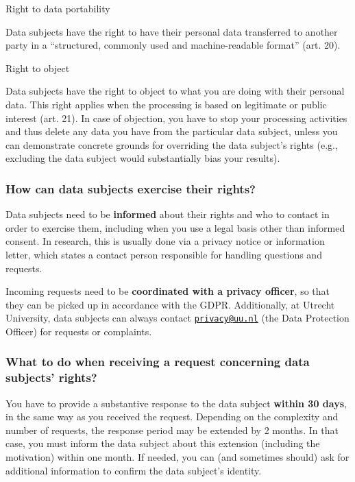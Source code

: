 \documentclass[
]{book}
\begin{document}
Right to data portability

Data subjects have the right to have their personal data transferred to
another party in a ``structured, commonly used and machine-readable format''
(art. 20).

Right to object

Data subjects have the right to object to what you are doing with their
personal data. This right applies when the processing is based on legitimate
or public interest (art. 21).
In case of objection, you have to stop your processing activities and thus
delete any data you have from the particular data subject, unless you can
demonstrate concrete grounds for overriding the data subject's rights
(e.g., excluding the data subject would substantially bias your results).

\hypertarget{how-can-data-subjects-exercise-their-rights}{%
\subsubsection{How can data subjects exercise their rights?}\label{how-can-data-subjects-exercise-their-rights}}

Data subjects need to be \textbf{informed} about their rights and who to contact in
order to exercise them, including when you use a legal basis other than informed
consent. In research, this is usually done via a
privacy notice or information letter, which states
a contact person responsible for handling questions and requests.

Incoming requests need to be \textbf{coordinated with a privacy officer}, so that
they can be picked up in accordance with the GDPR. Additionally, at Utrecht
University, data subjects can always contact
\href{mailto:privacy@uu.nl}{\nolinkurl{privacy@uu.nl}} (the Data Protection Officer) for
requests or complaints.

\hypertarget{what-to-do-when-receiving-a-request-concerning-data-subjects-rights}{%
\subsubsection{What to do when receiving a request concerning data subjects' rights?}\label{what-to-do-when-receiving-a-request-concerning-data-subjects-rights}}

You have to provide a substantive response to the data subject \textbf{within 30 days},
in the same way as you received the request. Depending on the complexity and
number of requests, the response period may be extended by 2 months. In that
case, you must inform the data subject about this extension (including the
motivation) within one month. If needed, you can (and sometimes should) ask for
additional information to confirm the data subject's identity.
\end{document}
